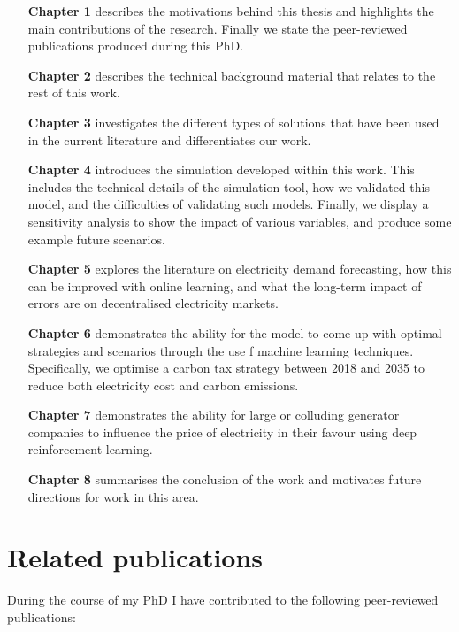 \begin{itemize}[itemindent=3em]
	\item[\textbf{Chapter 1}] describes the motivations behind this thesis and highlights the main contributions of the research. Finally we state the peer-reviewed publications produced during this PhD. 
	\item[\textbf{Chapter 2}] describes the technical background material that relates to the rest of this work.
	\item[\textbf{Chapter 3}] investigates the different types of solutions that have been used in the current literature and differentiates our work. 
	\item[\textbf{Chapter 4}] introduces the simulation developed within this work. This includes the technical details of the simulation tool, how we validated this model, and the difficulties of validating such models. Finally, we display a sensitivity analysis to show the impact of various variables, and produce some example future scenarios.
	\item[\textbf{Chapter 5}] explores the literature on electricity demand forecasting, how this can be improved with online learning, and what the long-term impact of errors are on decentralised electricity markets.
	\item[\textbf{Chapter 6}] demonstrates the ability for the model to come up with optimal strategies and scenarios through the use f machine learning techniques. Specifically, we optimise a carbon tax strategy between 2018 and 2035 to reduce both electricity cost and carbon emissions.
	\item[\textbf{Chapter 7}] demonstrates the ability for large or colluding generator companies to influence the price of  electricity in their favour using deep reinforcement learning.
	\item[\textbf{Chapter 8}] summarises the conclusion of the work and motivates future directions for work in this area.
\end{itemize}




\section{Related publications}

During the course of my PhD I have contributed to the following peer-reviewed publications:	


